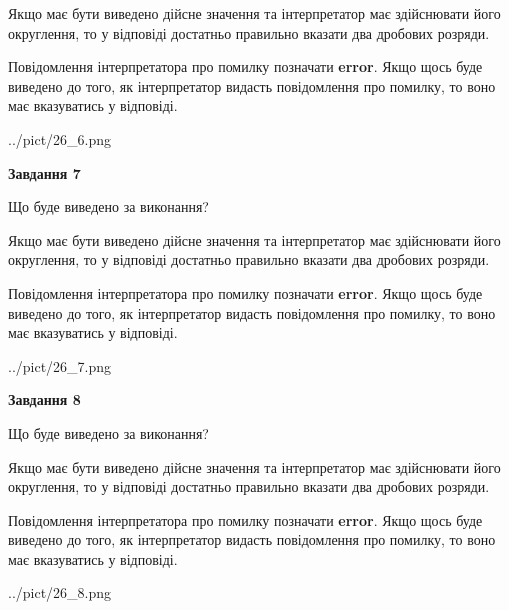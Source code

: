 \documentclass[12pt, ukrainian]{article}
\begin{document}
{\begin {Large}
Якщо має бути виведено дійсне значення та інтерпретатор має здійснювати його округлення, 
то у відповіді достатньо правильно вказати два дробових розряди.

Повідомлення інтерпретатора про помилку позначати \textbf{error}.
Якщо щось буде виведено до того, як інтерпретатор видасть повідомлення про помилку, 
то воно має вказуватись у відповіді. \par

\begin{center}
	{../pict/26_6.png}
\end{center}
\newpage

{\begin {center}\textbf{Завдання 7}\end {center}}\par
Що буде виведено за виконання? \par

Якщо має бути виведено дійсне значення та інтерпретатор має здійснювати його округлення, 
то у відповіді достатньо правильно вказати два дробових розряди.

Повідомлення інтерпретатора про помилку позначати \textbf{error}.
Якщо щось буде виведено до того, як інтерпретатор видасть повідомлення про помилку, 
то воно має вказуватись у відповіді. \par

\begin{center}
	{../pict/26_7.png}
\end{center}
\newpage

{\begin {center}\textbf{Завдання 8}\end {center}}\par
Що буде виведено за виконання? \par

Якщо має бути виведено дійсне значення та інтерпретатор має здійснювати його округлення, 
то у відповіді достатньо правильно вказати два дробових розряди.

Повідомлення інтерпретатора про помилку позначати \textbf{error}.
Якщо щось буде виведено до того, як інтерпретатор видасть повідомлення про помилку, 
то воно має вказуватись у відповіді. \par

\begin{center}
	{../pict/26_8.png}
\end{center}
\newpage


\end{Large}}
\end{document}
